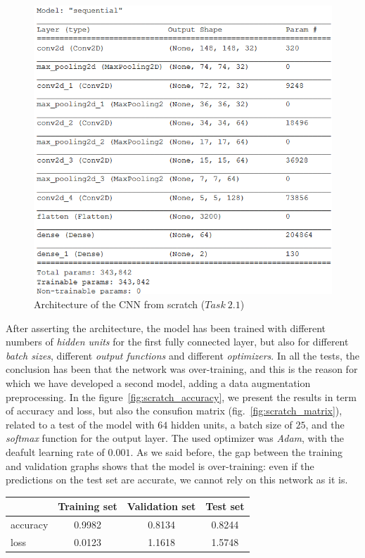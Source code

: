 \documentclass[11pt,a4paper,oneside]{article}
\begin{document}
\begin{figure}[h]
\centering
\includegraphics[width=.5\textwidth]{images/scratch_model}
\caption{Architecture of the CNN from scratch ($Task\ 2.1$)}
\label{fig:scratch_model}
\end{figure}

After asserting the architecture, the model has been trained with different numbers of \textit{hidden units} for the first fully connected layer, but also for different \textit{batch sizes}, different \textit{output functions} and different \textit{optimizers}. 
In all the tests, the conclusion has been that the network was over-training, and this is the reason for which we have developed a second model, adding a data augmentation preprocessing. 
In the figure~\ref{fig:scratch_accuracy}, we present the results in term of accuracy and loss, but also the consufion matrix (fig.~\ref{fig:scratch_matrix}), related to a test of the model with $64$ hidden units, a batch size of $25$, and the \textit{softmax} function for the output layer. 
The used optimizer was \textit{Adam}, with the deafult learning rate of $0.001$. As we said before, the gap between the training and validation graphs shows that the model is over-training: even if the predictions on the test set are accurate, we cannot rely on this network as it is.

\begin{center}
\begin{tabular}{|l|ccc|}
\hline
 & Training set & Validation set & Test set \\
\hline
accuracy & 0.9982 & 0.8134 & 0.8244 \\
loss & 0.0123 & 1.1618 & 1.5748 \\
\hline
\end{tabular}
\end{center}
\end{document}
